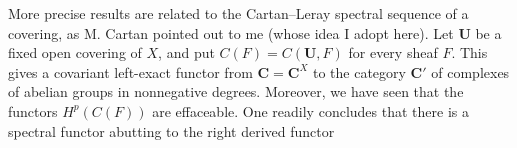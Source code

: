 More precise results are related to the Cartan--Leray spectral sequence of a
covering, as M. Cartan pointed out to me (whose idea I adopt here). Let
$\mathbf U$ be a fixed open covering of $X$, and put
$C(F)=C(\mathbf U,F)$ for every sheaf $F$. This gives a covariant left-exact
functor from $\mathbf C=\mathbf C^X$ to the category $\mathbf C'$ of complexes of abelian groups in
nonnegative degrees. Moreover, we have seen that the functors $H^p(C(F))$ are
effaceable. One readily concludes that there is a spectral functor abutting to
the right derived functor

